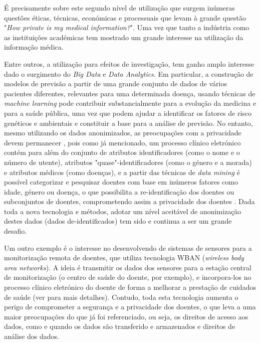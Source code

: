 \documentclass[conference]{IEEEtran}
\begin{document}
É precisamente sobre este segundo nível de utilização que surgem inúmeras questões éticas, técnicas, económicas e processuais que levam à grande questão "\textit{How private is my medical information?}". Uma vez que tanto a indústria como as instituições académicas tem mostrado um grande interesse na utilização da informação médica. 

Entre outros, a utilização para efeitos de investigação, tem ganho amplo interesse dado o surgimento do \textit{Big Data} e \textit{Data Analytics}. Em particular, a construção de modelos de previsão a partir de uma grande conjunto de dados de vários pacientes diferentes, relevantes para uma determinada doença, usando técnicas de \textit{machine learning} pode contribuir substancialmente para a evolução da medicina e para a saúde pública, uma vez que podem ajudar a identificar os fatores de risco genéticos e ambientais e constituir a base para a análise de previsão. No entanto, mesmo utilizando os dados anonimizados, as preocupações com a privacidade devem permanecer \cite{bos2014private}, pois como já mencionado, um processo clínico eletrónico contém para além do conjunto de atributos identificadores (como o nome e o número de utente), atributos "quase"-identificadores (como o género e a morada) e atributos médicos (como doenças), e a partir das técnicas de \textit{data mining} é possível categorizar e pesquisar doentes com base em inúmeros fatores como idade, género ou doença, o que possibilita a re-identificação dos doentes ou subconjuntos de doentes, comprometendo assim a privacidade dos doentes \cite{meingast2006security}.
Dada toda a nova tecnologia e métodos, adotar um nível aceitável de anonimização destes dados (dados de-identificados) tem sido e continua a ser um grande desafio.

Um outro exemplo é o interesse no desenvolvendo de sistemas de sensores para a monitorização remota de doentes, que utiliza tecnologia WBAN (\textit{wireless body area networks}). A ideia é transmitir os dados dos sensores para a estação central de monitorização (o centro de saúde do doente, por exemplo), e incorpora-los no processo clínico eletrónico do doente de forma a melhorar a prestação de cuidados de saúde (ver \cite{meingast2006security} para mais detalhes). Contudo, toda esta tecnologia aumenta o perigo de comprometer a segurança e a privacidade dos doentes, o que leva a uma maior preocupações do que já foi referenciado, ou seja, os direitos de acesso aos dados, como e quando os dados são transferido e armazenados e direitos de análise dos dados.
\end{document}

